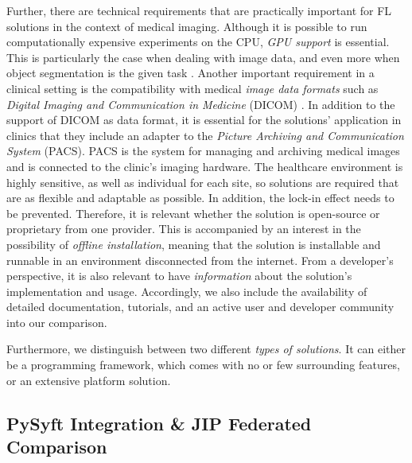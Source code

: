 Further, there are technical requirements that are practically important for FL solutions in the context of medical imaging.
Although it is possible to run computationally expensive experiments on the CPU, \textit{GPU support} is essential. This is particularly the case when dealing with image data, and even more when object segmentation is the given task \cite{Kaissis2021End-to-endImaging, Lee2021FederatedEnvironment}.
Another important requirement in a clinical setting is the  compatibility with medical \textit{image data formats} such as \textit{Digital Imaging and Communication in Medicine} (DICOM) \citep{Kaissis2021End-to-endImaging}.
In addition to the support of DICOM as data format, it is essential for the solutions' application in clinics that they  include an adapter to the \textit{Picture Archiving and Communication System} (PACS). PACS is the system for managing and archiving medical images and is connected to the clinic's imaging hardware.
The healthcare environment is highly sensitive, as well as individual for each site, so solutions are required that are as flexible and adaptable as possible. In addition, the lock-in effect needs to be prevented. Therefore, it is relevant whether the solution is open-source or proprietary from one provider.
This is accompanied by an interest in the possibility of \textit{offline installation}, meaning that the solution is installable and runnable in an environment disconnected from the internet.
From a developer's perspective, it is also relevant to have \textit{information} about the solution's implementation and usage. Accordingly, we also include the availability of detailed documentation, tutorials, and an active user and developer community into our comparison.

Furthermore, we distinguish between two different \textit{types of solutions}. It can either be a programming framework, which comes with no or few surrounding features, or an extensive platform solution.






\subsection{PySyft Integration \& JIP Federated Comparison}
\label{subsec:ResultsRuntime}

